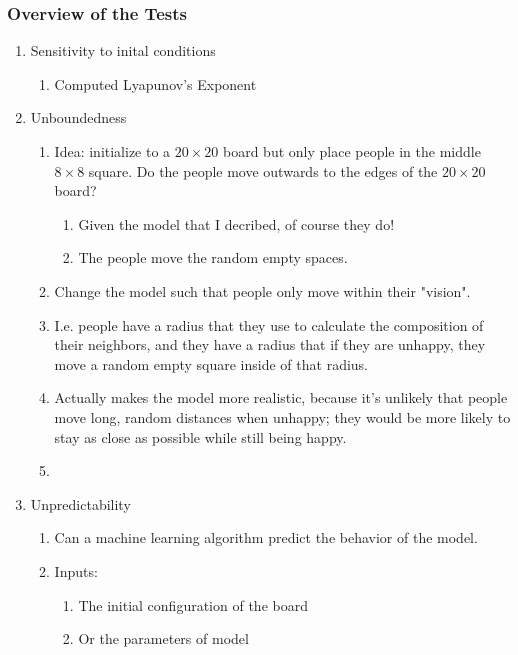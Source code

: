 \documentclass[11pt, handout]{beamer}
\begin{document}
\begin{frame}
    \frametitle{Overview of the Tests}
    \begin{enumerate}
        \item Sensitivity to inital conditions
            \begin{enumerate}
                \item Computed Lyapunov's Exponent
            \end{enumerate}
        \item Unboundedness
            \begin{enumerate}
                \item Idea: initialize to a $20 \times 20$ board but only place people in the middle $8\times 8$ square. Do the people move outwards to the edges of the $20 \times 20$ board?
                    \begin{enumerate}
                        \item Given the model that I decribed, of course they do!
                        \item The people move the random empty spaces.
                    \end{enumerate}
                    \item Change the model such that people only move within their "vision".
                    \item I.e. people have a radius that they use to calculate the composition of their neighbors, and they have a radius that if they are unhappy, they move a random empty square inside of that radius.
                    \item Actually makes the model more realistic, because it's unlikely that people move long, random distances when unhappy; they would be more likely to stay as close as possible while still being happy.
                \item 
            \end{enumerate}
        \item Unpredictability
            \begin{enumerate}
                \item Can a machine learning algorithm predict the behavior of the model.
                \item Inputs: 
                    \begin{enumerate}
                        \item The initial configuration of the board 
                        \item Or the parameters of model

\end{enumerate}
\end{enumerate}
\end{enumerate}
\end{frame}
\end{document}
